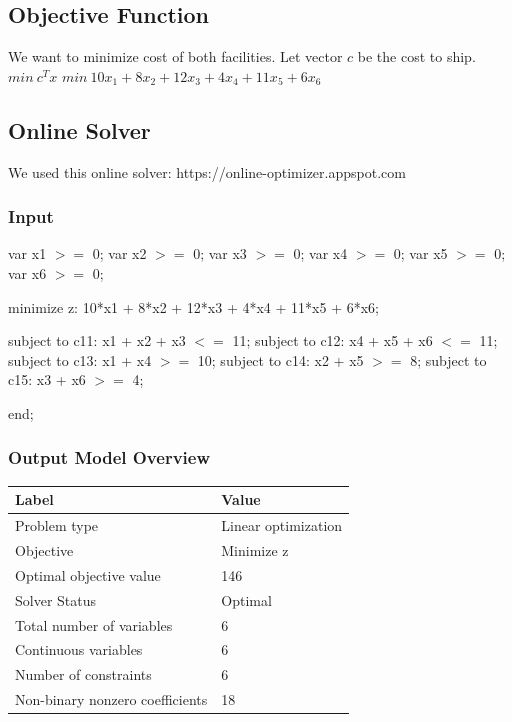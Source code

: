 \documentclass[14pt]{extarticle}
\begin{document}
\subsection*{Objective Function}
We want to minimize cost of both facilities. Let vector $c$ be the cost to ship.
\newline $min\ c^Tx$
\newline $min\ 10x_1 + 8x_2 + 12x_3 + 4x_4 + 11x_5 + 6x_6$

\subsection*{Online Solver}
We used this online solver: https://online-optimizer.appspot.com

\subsubsection*{Input}
         var x1 $>=$ 0;
\newline var x2 $>=$ 0;
\newline var x3 $>=$ 0;
\newline var x4 $>=$ 0;
\newline var x5 $>=$ 0;
\newline var x6 $>=$ 0;

\bigskip minimize z: 10*x1 + 8*x2 + 12*x3 + 4*x4 + 11*x5 + 6*x6;

\bigskip subject to c11: x1 + x2 + x3 $<=$ 11;
\newline subject to c12: x4 + x5 + x6 $<=$ 11;
\newline subject to c13: x1 + x4 $>=$ 10;
\newline subject to c14: x2 + x5 $>=$ 8;
\newline subject to c15: x3 + x6 $>=$ 4;

\bigskip end;

\subsubsection*{Output Model Overview}
\begin{tabular}{|l|l|}
    \hline
    Label & Value \\
    \hline
    Problem type & Linear optimization \\
    \hline
    Objective & Minimize z \\
    \hline
    Optimal objective value & 146 \\
    \hline
    Solver Status & Optimal \\
    \hline
    Total number of variables & 6 \\
    \hline
    Continuous variables & 6 \\
    \hline
    Number of constraints & 6 \\
    \hline
    Non-binary nonzero coefficients & 18 \\
    \hline
\end{tabular}
\end{document}
